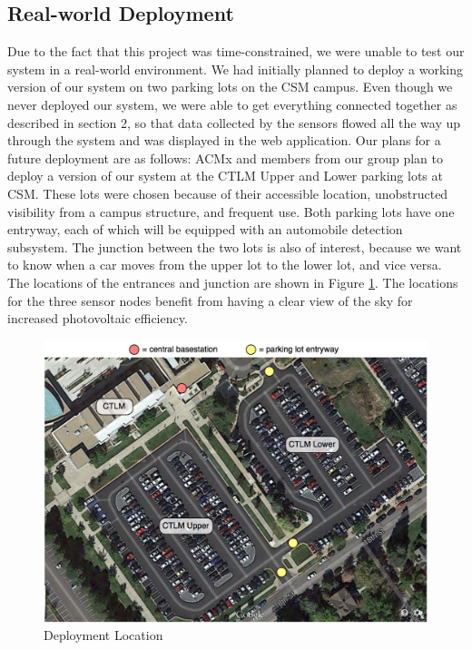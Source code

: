\documentclass[11pt, oneside, fullpage, doublespace]{article}
\begin{document}
\subsection{Real-world Deployment}
Due to the fact that this project was time-constrained, we were unable to test our system in a real-world environment. We had initially planned to deploy a working version of our system on two parking lots on the CSM campus. Even though we never deployed our system, we were able to get everything connected together as described in section 2, so that data collected by the sensors flowed all the way up through the system and was displayed in the web application. Our plans for a future deployment are as follows: ACMx and members from our group plan to deploy a version of our system at the CTLM Upper and Lower parking lots at CSM. These lots were chosen because of their accessible location, unobstructed visibility from a campus structure, and frequent use. Both parking lots have one entryway, each of which will be equipped with an automobile detection subsystem. The junction between the two lots is also of interest, because we want to know when a car moves from the upper lot to the lower lot, and vice versa. The locations of the entrances and junction are shown in Figure \ref{fig:deployment}. The locations for the three sensor nodes benefit from having a clear view of the sky for increased photovoltaic efficiency.
\begin{figure}
\begin{center}
\includegraphics[width=5in]{deployment}
\end{center}
\caption{Deployment Location}
\label{fig:deployment}
\end{figure}
\end{document}
